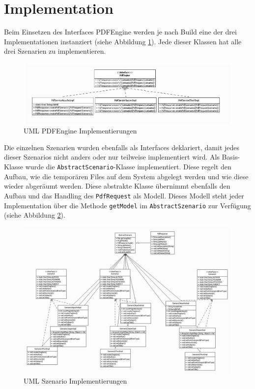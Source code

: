 \documentclass[main.tex]{subfiles}
\begin{document}
\section{Implementation}

Beim Einsetzen des Interfaces PDFEngine werden je nach Build eine der drei Implementationen instanziert (siehe Abbildung \ref{figure:pdfEngineImpl}). Jede dieser Klassen hat alle drei Szenarien zu implementieren.  


\begin{figure}[h]
 
\includegraphics[width=\textwidth ]{pic/uml/PdfEngineImplemntierung.jpg}
 \caption{UML PDFEngine Implementierungen}
 \label{figure:pdfEngineImpl}
\end{figure}

Die einzelnen Szenarien wurden ebenfalls als Interfaces deklariert, damit jedes dieser Szenarios nicht anders oder nur teilweise implementiert wird. Als Basis-Klasse wurde die \texttt{AbstractScenario}-Klasse implementiert. Diese regelt den Aufbau, wie die temporären Files auf dem System abgelegt werden und wie diese wieder abgeräumt werden. Diese abstrakte Klasse übernimmt ebenfalls den Aufbau und das Handling des \texttt{PdfRequest} als Modell. Dieses Modell steht jeder Implementation über die Methode \texttt{getModel} im \texttt{AbstractSzenario} zur Verfügung (siehe Abbildung \ref{figure:szenImpl}).   

\begin{figure}[h]
\includegraphics[width=\textwidth ]{pic/uml/SzenarioImplementation.jpg}
 \caption{UML Szenario Implementierungen}
 \label{figure:szenImpl}
\end{figure}
\end{document}
